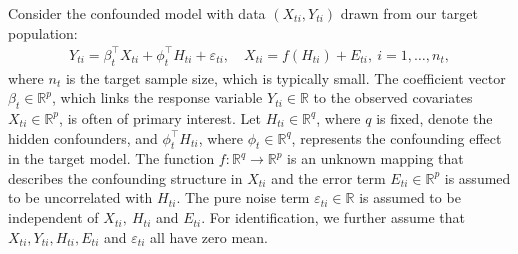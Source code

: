 \documentclass[12pt]{article}
\begin{document}

Consider the confounded model with data $(X_{ti}, Y_{ti})$ drawn from our target population:
\begin{align}
\label{eq:target_model}
    Y_{ti} = \beta_t^\top X_{ti} + \phi_t^\top H_{ti} + \varepsilon_{ti},\quad X_{ti} = f(H_{ti}) +E_{ti}, \ i = 1, \dots, n_t,
\end{align}
where $n_t$ is the target sample size, which is typically small. The coefficient vector $\beta_t\in \mathbb{R}^p$, which links the response variable $Y_{ti} \in \mathbb{R}$ to the observed covariates $X_{ti} \in \mathbb{R}^p$, is often of primary interest. Let $H_{ti}\in \mathbb{R}^q$, where $q$ is fixed, denote the hidden confounders, and $\phi_t^\top H_{ti}$, where $\phi_t\in \mathbb{R}^q$, represents the confounding effect in the target model. The function $f: \mathbb{R}^{q}\to\mathbb{R}^p$ is an unknown mapping that describes the confounding structure in $X_{ti}$ and the error term $E_{ti}\in \mathbb{R}^p$ is assumed to be uncorrelated with $H_{ti}$. 
The pure noise term $\varepsilon_{ti}\in \mathbb{R}$ is assumed to be independent of $X_{ti}, \ H_{ti}$ and $E_{ti}$. For identification, we further assume that $X_{ti},Y_{ti},H_{ti},E_{ti}$ and $\varepsilon_{ti}$ all have zero mean. 
\end{document}
